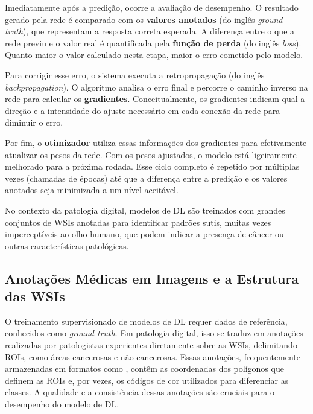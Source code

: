 Imediatamente após a predição, ocorre a avaliação de desempenho. O resultado gerado pela rede é comparado com os \textbf{valores anotados} (do inglês \textit{ground truth}), que representam a resposta correta esperada. A diferença entre o que a rede previu e o valor real é quantificada pela \textbf{função de perda} (do inglês \textit{loss}). Quanto maior o valor calculado nesta etapa, maior o erro cometido pelo modelo.

Para corrigir esse erro, o sistema executa a retropropagação (do inglês \textit{backpropagation}). O algoritmo analisa o erro final e percorre o caminho inverso na rede para calcular os \textbf{gradientes}. Conceitualmente, os gradientes indicam qual a direção e a intensidade do ajuste necessário em cada conexão da rede para diminuir o erro.

Por fim, o \textbf{otimizador} utiliza essas informações dos gradientes para efetivamente atualizar os pesos da rede. Com os pesos ajustados, o modelo está ligeiramente melhorado para a próxima rodada. Esse ciclo completo é repetido por múltiplas vezes (chamadas de épocas) até que a diferença entre a predição e os valores anotados seja minimizada a um nível aceitável.

No contexto da patologia digital, modelos de DL são treinados com grandes conjuntos de WSIs anotadas para identificar padrões sutis, muitas vezes imperceptíveis ao olho humano, que podem indicar a presença de câncer ou outras características patológicas.

\subsection{Anotações Médicas em Imagens e a Estrutura das WSIs}\label{subsec:anotacoes_estrutura_wsi}

O treinamento supervisionado de modelos de DL requer dados de referência, conhecidos como \textit{ground truth}. Em patologia digital, isso se traduz em anotações realizadas por patologistas experientes diretamente sobre as WSIs, delimitando ROIs, como áreas cancerosas e não cancerosas. %
Essas anotações, frequentemente armazenadas em formatos como , contêm as coordenadas dos polígonos que definem as ROIs e, por vezes, os códigos de cor utilizados para diferenciar as classes. A qualidade e a consistência dessas anotações são cruciais para o desempenho do modelo de DL.

